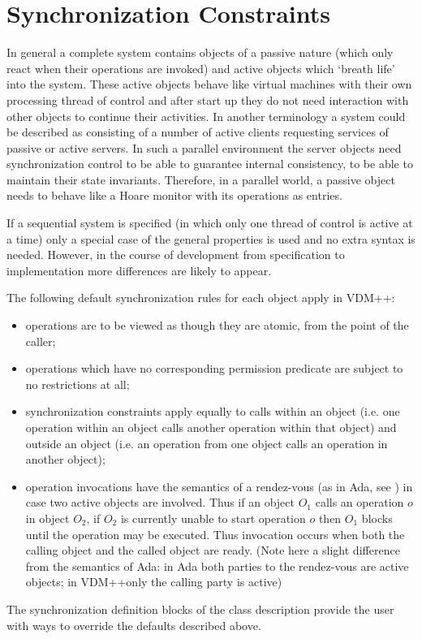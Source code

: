 \documentclass[\pformat,12pt]{article}
\newcommand{\vdmpp}{VDM++}
\begin{document}
\section{Synchronization Constraints}\label{ch:sync}

In general a complete system contains objects of a passive
nature (which only react when their operations are invoked) and active
objects which `breath life' into the system. These active objects
behave like virtual machines with their own processing thread of
control and after start up they do not need interaction with other
objects to continue their activities.
In another terminology a system could be described as
consisting of a number of active clients requesting services of passive
or active servers.
In such a parallel environment the server objects need
synchronization control to be able to guarantee internal consistency,
to be able to maintain their state invariants.
Therefore, in a parallel world, a passive object needs to
behave like a Hoare monitor with its operations as entries.

If a sequential system is specified (in which only one thread of control
is active at a time) only a special case of the general properties is used
and no extra syntax is needed. However, in the course of development from
specification to implementation more differences are likely to appear.

The following default synchronization rules for each object apply in {\vdmpp}:
\begin{itemize}
\item operations are to be viewed as though they are atomic, from the
point of the caller; 
\item operations which have no corresponding permission predicate are
  subject to no restrictions at all;
\item synchronization constraints apply equally to calls within an
  object (i.e. one operation within an object calls another operation
  within that object) and outside an object (i.e. an operation from
  one object calls an operation in another object);
\item operation invocations have the semantics of a rendez-vous (as in
Ada, see \cite{adalrm}) in case two active objects are involved. Thus if an
object $O_1$ calls an operation $o$ in object $O_2$, if $O_2$ is currently
unable to start operation $o$ then $O_1$ blocks until the operation may be
executed. Thus invocation occurs when both the calling object and the
called object are ready. (Note here a slight difference from the
semantics of Ada: in Ada both parties to the rendez-vous are active
objects; in \vdmpp only the calling party is active)
\end{itemize}
The synchronization definition blocks of the class description provide the
user with ways to override the defaults described above.
\end{document}
